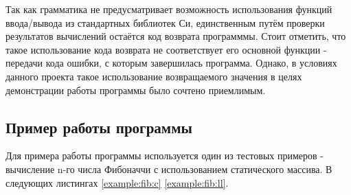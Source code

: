 Так как грамматика не предусматривает возможность использования функций ввода/вывода из стандартных библиотек Си, единственным путём проверки результатов вычислений остаётся код возврата программмы. Стоит отметить, что такое использование кода возврата не соответствует его основной функции - передачи кода ошибки, с которым завершилась программа. Однако, в условиях данного проекта такое использование возвращаемого значения в целях демонстрации работы программы было сочтено приемлимым.

\subsection{Пример работы программы}
Для примера работы программы используется один из тестовых примеров - вычисление n-го числа Фибоначчи с использованием статического массива. В следующих листингах \ref{example:fib:c} \ref{example:fib:ll}.

\label{example:fib:c}
\label{example:fib:ll}

\pagebreak